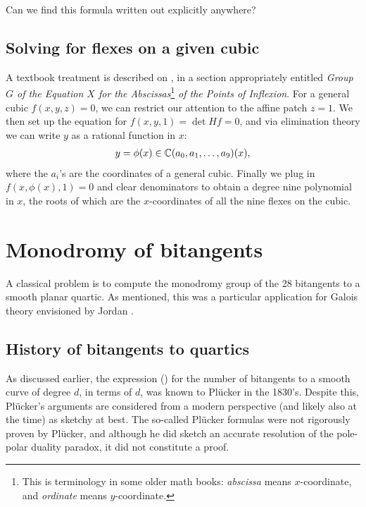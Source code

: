 \documentclass[11pt]{amsart}
\begin{document}
\begin{question} Can we find this formula written out explicitly anywhere?
\end{question}

\subsection{Solving for flexes on a given cubic}

A textbook treatment is described on \cite[p.~333]{MillerBlichfeldtDickson}, in a section appropriately entitled \emph{Group $G$ of the Equation $X$ for the Abscissas}\footnote{This is terminology in some older math books: \textit{abscissa} means $x$-coordinate, and \textit{ordinate} means $y$-coordinate.} \emph{of the Points of Inflexion}. For a general cubic $f(x,y,z)=0$, we can restrict our attention to the affine patch $z=1$. We then set up the equation for $f(x,y,1)=\det Hf = 0$, and via elimination theory we can write $y$ as a rational function in $x$:
\begin{align*}
    y = \phi(x) \in \mathbb{C}(a_0,a_1, \ldots, a_9)(x),
\end{align*}
where the $a_i$'s are the coordinates of a general cubic. Finally we plug in $f(x,\phi(x),1) =0$ and clear denominators to obtain a degree nine polynomial in $x$, the roots of which are the $x$-coordinates of all the nine flexes on the cubic.


\section{Monodromy of bitangents}

A classical problem is to compute the monodromy group of the 28 bitangents to a smooth planar quartic. As mentioned, this was a particular application for Galois theory envisioned by Jordan \cite[III.VI]{Jordan}.

\subsection{History of bitangents to quartics}

As discussed earlier, the expression () for the number of bitangents to a smooth curve of degree $d$, in terms of $d$, was known to Pl\"{u}cker in the 1830's. Despite this, Pl\"{u}cker's arguments are considered from a modern perspective (and likely also at the time) as sketchy at best. The so-called Pl\"{u}cker formulas were not rigorously proven by Pl\"{u}cker, and although he did sketch an accurate resolution of the pole-polar duality paradox, it did not constitute a proof.
\end{document}

